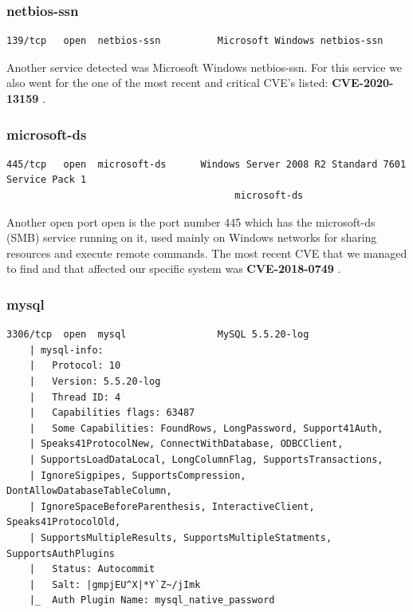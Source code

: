 \subsubsection{netbios-ssn}

\begin{lstlisting}[basicstyle=\scriptsize]
    139/tcp   open  netbios-ssn          Microsoft Windows netbios-ssn
\end{lstlisting}

Another service detected was Microsoft Windows netbios-ssn. For this service we also went for the one of the most recent and critical CVE's listed: \textbf{CVE-2020-13159} \cite{cve3}.


\subsubsection{microsoft-ds}

\begin{lstlisting}[basicstyle=\scriptsize]
  445/tcp   open  microsoft-ds      Windows Server 2008 R2 Standard 7601 Service Pack 1 
                                        microsoft-ds
\end{lstlisting}

Another open port open is the port number 445 which has the microsoft-ds (SMB) service running on it, used mainly on Windows networks for sharing resources and execute remote commands. The most recent CVE that we managed to find and that affected our specific system was \textbf{CVE-2018-0749} \cite{cve4}.
\subsubsection{mysql}

\begin{lstlisting}[basicstyle=\scriptsize]
    3306/tcp  open  mysql                MySQL 5.5.20-log
    | mysql-info: 
    |   Protocol: 10
    |   Version: 5.5.20-log
    |   Thread ID: 4
    |   Capabilities flags: 63487
    |   Some Capabilities: FoundRows, LongPassword, Support41Auth,
    | Speaks41ProtocolNew, ConnectWithDatabase, ODBCClient, 
    | SupportsLoadDataLocal, LongColumnFlag, SupportsTransactions, 
    | IgnoreSigpipes, SupportsCompression, DontAllowDatabaseTableColumn, 
    | IgnoreSpaceBeforeParenthesis, InteractiveClient, Speaks41ProtocolOld, 
    | SupportsMultipleResults, SupportsMultipleStatments, SupportsAuthPlugins
    |   Status: Autocommit
    |   Salt: |gmpjEU^X|*Y`Z~/jImk
    |_  Auth Plugin Name: mysql_native_password
\end{lstlisting}

